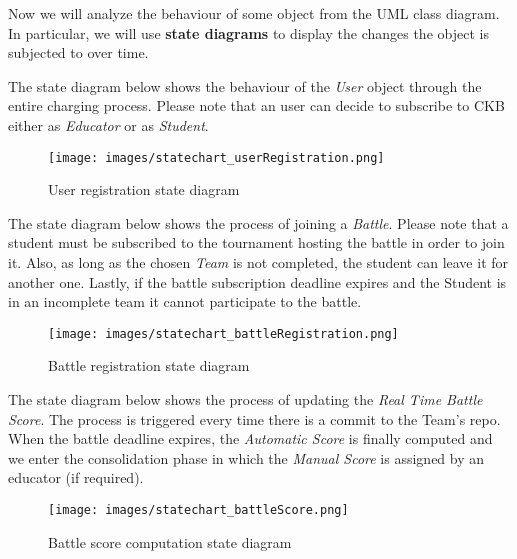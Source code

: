 \documentclass[a4paper, 11pt, titlepage]{article}
\begin{document}
\newpage

Now we will analyze the behaviour of some object from the UML class diagram. In particular, we will use \textbf{state diagrams} to display the changes the object is subjected to over time.

\vspace{0.5cm}

The state diagram below shows the behaviour of the \emph{User} object through the entire charging process. Please note that an user can decide to subscribe to CKB either as \emph{Educator} or as \emph{Student}. 

\begin{figure}[h]
    \texttt{[image: images/statechart\_userRegistration.png]}
    \caption{User registration state diagram}
    \label{fig:CKB_sc1}
    \centering
\end{figure}

The state diagram below shows the process of joining a \emph{Battle}. Please note that a student must be subscribed to the tournament hosting the battle in order to join it. Also, as long as the chosen \emph{Team} is not completed, the student can leave it for another one. Lastly, if the battle subscription deadline expires and the Student is in an incomplete team it cannot participate to the battle.

\begin{figure}[h]
    \texttt{[image: images/statechart\_battleRegistration.png]}
    \caption{Battle registration state diagram}
    \label{fig:CKB_sc2}
    \centering
\end{figure}

\newpage

The state diagram below shows the process of updating the \emph{Real Time Battle Score}. The process is triggered every time there is a commit to the Team's repo. When the battle deadline expires, the \emph{Automatic Score} is finally computed and we enter the consolidation phase in which the \emph{Manual Score} is assigned by an educator (if required). 

\begin{figure}[h]
    \texttt{[image: images/statechart\_battleScore.png]}
    \caption{Battle score computation state diagram}
    \label{fig:CKB_sc3}
    \centering
\end{figure}
\end{document}
